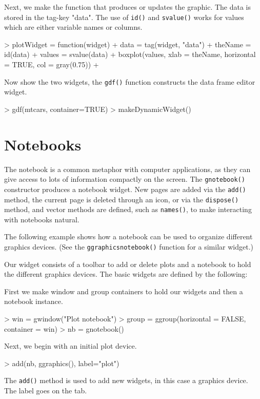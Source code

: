 \documentclass[12pt]{article}
\newcommand{\RFunc}[1]{\texttt{#1()}}
\begin{document}
Next, we make the function that produces or updates the graphic. The
data is stored in the tag-key "data". The use of \RFunc{id} and
\RFunc{svalue} works for values which are either variable names or columns.

\begin{Schunk}
\begin{Sinput}
> plotWidget = function(widget) {
+     data = tag(widget, "data")
+     theName = id(data)
+     values = svalue(data)
+     boxplot(values, xlab = theName, horizontal = TRUE, col = gray(0.75))
+ }
\end{Sinput}
\end{Schunk}

Now show the two widgets, the \RFunc{gdf} function constructs the data
frame editor widget.
\begin{Soutput}
> gdf(mtcars, container=TRUE)
> makeDynamicWidget()
\end{Soutput}


\section{Notebooks}

The notebook is a common metaphor with computer applications, as they
can give access to lots of information compactly on the screen. The
\RFunc{gnotebook} constructor produces a notebook
widget. New pages are added via the \RFunc{add} method, the current
page is deleted through an icon, or via the \RFunc{dispose} method,
and vector methods are defined, such as \RFunc{names}, to make
interacting with notebooks natural.

The following example shows how a notebook can be used to organize
different graphics devices. (See the \RFunc{ggraphicsnotebook} function
for a similar widget.)

Our widget consists of a toolbar to add or delete plots and a notebook
to hold the different graphics devices. The basic widgets are defined
by the following:

First we make window and group containers to hold our widgets and then
a notebook instance.
\begin{Schunk}
\begin{Sinput}
> win = gwindow("Plot notebook")
> group = ggroup(horizontal = FALSE, container = win)
> nb = gnotebook()
\end{Sinput}
\end{Schunk}
Next, we begin with an initial plot device.
\begin{Soutput}
> add(nb, ggraphics(), label="plot")
\end{Soutput}
The \RFunc{add} method is used to add new widgets, in this case a
graphics device. The label goes on the tab.
\end{document}
